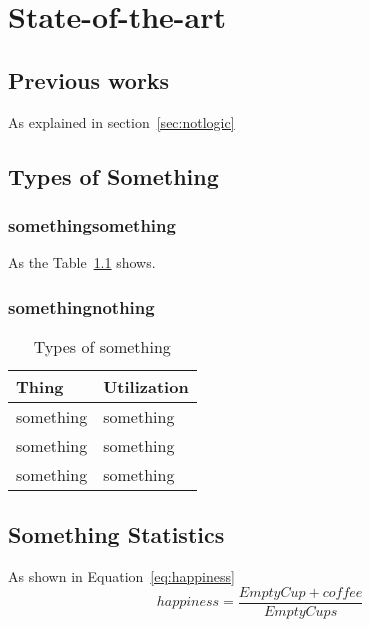 \chapter{State-of-the-art}
\label{ch:stateart}

\section{Previous works}
\label{sec:prevworks}
	
	As explained in section~\ref{sec:notlogic}
	
	
\section{Types of Something}
\label{sec:typesome}

		
		\subsection{somethingsomething}
		\label{subsec:somesome}
		
		As the Table~\ref{tb:typesomething} shows.
		
		\subsection{somethingnothing}
		\label{subsec:somenoth}
		
        \begin{table}[]
            \centering
            \begin{tabular}{ll}
            \hline
            \textbf{Thing} & \textbf{Utilization} \\
            \hline
                something & something \\
                something & something \\
                something & something \\
                \hline
            \end{tabular}
            \caption{Types of something}
            \label{tb:typesomething}
        \end{table}
		
\section{Something Statistics}
\label{sec:somestatistics}
	
		As shown in Equation~\ref{eq:happiness}
		\begin{equation}\label{eq:happiness}
			happiness=\frac{EmptyCup+coffee}{EmptyCups}
		\end{equation}	
	
